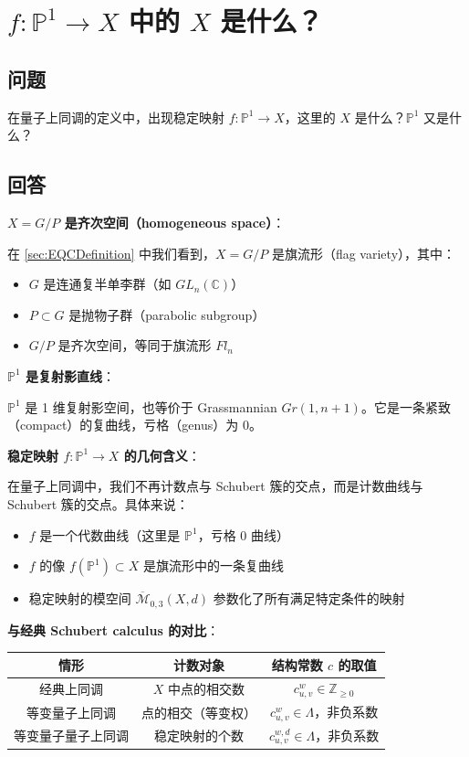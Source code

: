 \section{$f: \mathbb{P}^1 \to X$ 中的 $X$ 是什么？}\label{sec:P1-to-X}
\subsection{问题}
在量子上同调的定义中，出现稳定映射 $f: \mathbb{P}^1 \to X$，这里的 $X$ 是什么？$\mathbb{P}^1$ 又是什么？

\subsection{回答}
\textbf{$X = G/P$ 是齐次空间（homogeneous space）}：

在 \cref{sec:EQCDefinition} 中我们看到，$X = G/P$ 是旗流形（flag variety），其中：
\begin{itemize}
\item $G$ 是连通复半单李群（如 $GL_n(\mathbb{C})$）
\item $P \subset G$ 是抛物子群（parabolic subgroup）
\item $G/P$ 是齐次空间，等同于旗流形 $Fl_n$
\end{itemize}

\textbf{$\mathbb{P}^1$ 是复射影直线}：

$\mathbb{P}^1$ 是 1 维复射影空间，也等价于 Grassmannian $Gr(1, n+1)$。它是一条紧致（compact）的复曲线，亏格（genus）为 0。

\textbf{稳定映射 $f: \mathbb{P}^1 \to X$ 的几何含义}：

在量子上同调中，我们不再计数点与 Schubert 簇的交点，而是计数曲线与 Schubert 簇的交点。具体来说：
\begin{itemize}
\item $f$ 是一个代数曲线（这里是 $\mathbb{P}^1$，亏格 0 曲线）
\item $f$ 的像 $f(\mathbb{P}^1) \subset X$ 是旗流形中的一条复曲线
\item 稳定映射的模空间 $\overline{\mathcal{M}}_{0,3}(X,d)$ 参数化了所有满足特定条件的映射
\end{itemize}

\textbf{与经典 Schubert calculus 的对比}：
\begin{center}
\begin{tabular}{c|c|c}
情形 & 计数对象 & 结构常数 $c$ 的取值 \\ \hline
经典上同调 & $X$ 中点的相交数 & $c_{u,v}^w \in \mathbb{Z}_{\geq 0}$ \\
等变量子上同调 & 点的相交（等变权） & $c_{u,v}^w \in \Lambda$，非负系数 \\
等变量子量子上同调 & 稳定映射的个数 & $c_{u,v}^{w,d} \in \Lambda$，非负系数 \\
\end{tabular}
\end{center}


